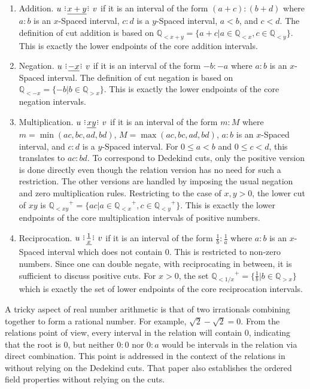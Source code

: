 \documentclass[12pt]{article}
\newcommand{\qcut}[2][x]{\ensuremath{\mathbb{Q}_{#2 #1}}}
\newcommand{\qlt}[1][x]{\qcut[#1]{<}}
\newcommand{\qgt}[1][x]{\qcut[#1]{>}}
\begin{document}
\begin{enumerate}
    \item Addition. $u \xrel[x+y] v$ if it is an interval of the form $(a+c):(b+d)$ where $a:b$ is an $x$-Spaced interval, $c:d$ is a $y$-Spaced interval, $a < b$, and $c < d$. The definition of cut addition is based on $\qlt[x+y] = \{a + c | a \in \qlt, c \in \qlt[y]\} $. This is exactly the lower endpoints of the core addition intervals. 
    \item Negation. $u \xrel[-x] v$ if it is an interval of the form $-b:-a$ where $a:b$ is an $x$-Spaced interval. The definition of cut negation is based on $\qlt[-x] = \{-b | b \in \qgt\}$. This is exactly the lower endpoints of the core negation intervals. 
    \item Multiplication. $u \xrel[xy] v$  if it is an interval of the form $m:M$ where $m = \min(ac, bc, ad, bd)$, $M = \max(ac, bc, ad, bd)$, $a:b$ is an $x$-Spaced interval, and $c:d$ is a $y$-Spaced interval. For $0 \leq a < b$ and $0 \leq c < d$, this translates to $ac:bd$. To correspond to Dedekind cuts, only the positive version is done directly even though the relation version has no need for such a restriction. The other versions are handled by imposing the usual negation and zero multiplication rules. Restricting to the case of $x , y > 0$, the lower cut of $xy$ is $\qlt[xy]^+ = \{ac | a \in \qlt^+, c \in \qlt[y]^+ \}$. This is exactly the lower endpoints of the core multiplication intervals of positive numbers. 
    \item Reciprocation. $u \xrel[\frac{1}{x}] v$ if it is an interval of the form $\frac{1}{b}:\frac{1}{a}$ where $a:b$ is an $x$-Spaced interval which does not contain 0. This is restricted to non-zero numbers. Since one can double negate, with reciprocating in between, it is sufficient to discuss positive cuts. For $x> 0$, the set $\qlt[1/x]^+ = \{\frac{1}{b} | b \in \qgt\}$ which is exactly the set of lower endpoints of the core reciprocation intervals. 
\end{enumerate}

A tricky aspect of real number arithmetic is that of two irrationals combining together to form a rational number. For example, $\sqrt{2} - \sqrt{2} = 0$. From the relations point of view, every interval in the relation will contain $0$, indicating that the root is $0$, but neither $0:0$ nor $0:a$ would be intervals in the relation via direct combination. This point is addressed in the context of the relations in \cite{taylor24oraclerbr} without relying on the Dedekind cuts. That paper also establishes the ordered field properties without relying on the cuts. 
\end{document}
